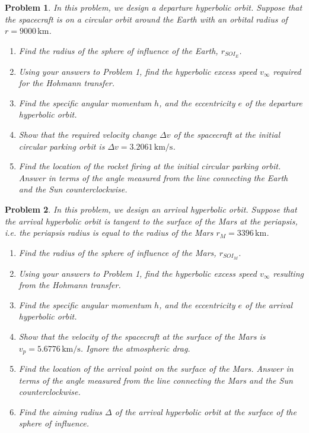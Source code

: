 \documentclass[10pt]{article}
\theoremstyle{plain}\theorembodyfont{\normalfont}
\newtheorem{prob}{Problem}[section]
\newenvironment{subprob}%
{\renewcommand{\theenumi}{\alph{enumi}}\renewcommand{\labelenumi}{(\theenumi)}\begin{enumerate}}%
{\end{enumerate}}%
\begin{document}
\begin{prob}
In this problem, we design a departure hyperbolic orbit. Suppose that the spacecraft is on a circular orbit around the Earth with an orbital radius of $r=9000\,\mathrm{km}$.
\begin{subprob}
\item Find the radius of the sphere of influence of the Earth, $r_{SOI_E}$. %
\item Using your answers to Problem 1, find the hyperbolic excess speed $v_\infty$ required for the Hohmann transfer.
\item Find the specific angular momentum $h$, and the eccentricity $e$ of the departure hyperbolic orbit.
\item Show that the required velocity change $\Delta v$ of the spacecraft at the initial circular parking orbit is $\Delta v = 3.2061\,\mathrm{km/s}$.  

\item Find the location of the rocket firing at the initial circular parking orbit. Answer in terms of the angle measured from the line connecting the Earth and the Sun counterclockwise.
\end{subprob}
\end{prob}

\begin{prob} 
In this problem, we design an arrival hyperbolic orbit. Suppose that the arrival hyperbolic orbit is tangent to the surface of the Mars at the periapsis, i.e. the periapsis radius is equal to the radius of the Mars $r_{M}=3396\,\mathrm{km}$.
\begin{subprob}
\item Find the radius of the sphere of influence of the Mars, $r_{SOI_M}$. %
\item Using your answers to Problem 1, find the hyperbolic excess speed $v_\infty$ resulting from the Hohmann transfer.
\item Find the specific angular momentum $h$, and the eccentricity $e$ of the arrival hyperbolic orbit.
\item Show that the velocity of the spacecraft at the surface of the Mars is $v_p=5.6776\,\mathrm{km/s}$. Ignore the atmospheric drag. 
\item Find the location of the arrival point on the surface of the Mars. Answer in terms of the angle measured from the line connecting the Mars and the Sun counterclockwise.
\item Find the aiming radius $\Delta$ of the arrival hyperbolic orbit at the surface of the sphere of influence.
\end{subprob}
\end{prob}
\end{document}

